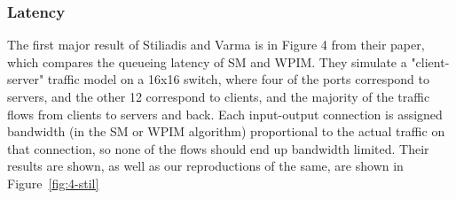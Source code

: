 \subsubsection{Latency}

The first major result of Stiliadis and Varma is in Figure 4 from their paper, which compares the queueing latency of SM and WPIM. They simulate a "client-server" traffic model on a 16x16 switch, where four of the ports correspond to servers, and the other 12 correspond to clients, and the majority of the traffic flows from clients to servers and back. Each input-output connection is assigned bandwidth (in the SM or WPIM algorithm) proportional to the actual traffic on that connection, so none of the flows should end up bandwidth limited. Their results are shown, as well as our reproductions of the same, are shown in Figure~\ref{fig:4-stil}

